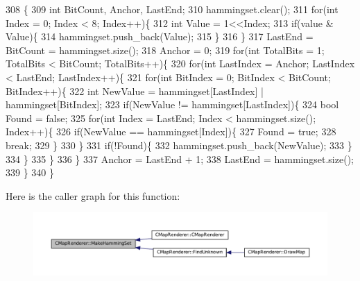 \begin{DoxyCode}
308                                                                         \{
309     \textcolor{keywordtype}{int} BitCount, Anchor, LastEnd;
310     hammingset.clear();
311     \textcolor{keywordflow}{for}(\textcolor{keywordtype}{int} Index = 0; Index < 8; Index++)\{
312         \textcolor{keywordtype}{int} Value = 1<<Index;
313         \textcolor{keywordflow}{if}(value & Value)\{
314             hammingset.push\_back(Value);
315         \}
316     \}
317     LastEnd = BitCount = hammingset.size();
318     Anchor = 0;
319     \textcolor{keywordflow}{for}(\textcolor{keywordtype}{int} TotalBits = 1; TotalBits < BitCount; TotalBits++)\{
320         \textcolor{keywordflow}{for}(\textcolor{keywordtype}{int} LastIndex = Anchor; LastIndex < LastEnd; LastIndex++)\{
321             \textcolor{keywordflow}{for}(\textcolor{keywordtype}{int} BitIndex = 0; BitIndex < BitCount; BitIndex++)\{
322                 \textcolor{keywordtype}{int} NewValue = hammingset[LastIndex] | hammingset[BitIndex];
323                 \textcolor{keywordflow}{if}(NewValue != hammingset[LastIndex])\{
324                     \textcolor{keywordtype}{bool} Found = \textcolor{keyword}{false};
325                     \textcolor{keywordflow}{for}(\textcolor{keywordtype}{int} Index = LastEnd; Index < hammingset.size(); Index++)\{
326                         \textcolor{keywordflow}{if}(NewValue == hammingset[Index])\{
327                             Found = \textcolor{keyword}{true};
328                             \textcolor{keywordflow}{break};
329                         \}
330                     \}
331                     \textcolor{keywordflow}{if}(!Found)\{
332                         hammingset.push\_back(NewValue);   
333                     \}
334                 \}
335             \}
336         \}
337         Anchor = LastEnd + 1;
338         LastEnd = hammingset.size();
339     \}
340 \}
\end{DoxyCode}
Here is the caller graph for this function\+:\nopagebreak
\begin{figure}[H]
\begin{center}
\leavevmode
\includegraphics[width=350pt]{classCMapRenderer_a0b06ba89b9a7ad75fa945a3c22dc019a_icgraph}
\end{center}
\end{figure}
\hypertarget{classCMapRenderer_a68b0c78e7d7d532c14eaf483f4ea3f24}{}\label{classCMapRenderer_a68b0c78e7d7d532c14eaf483f4ea3f24} 
